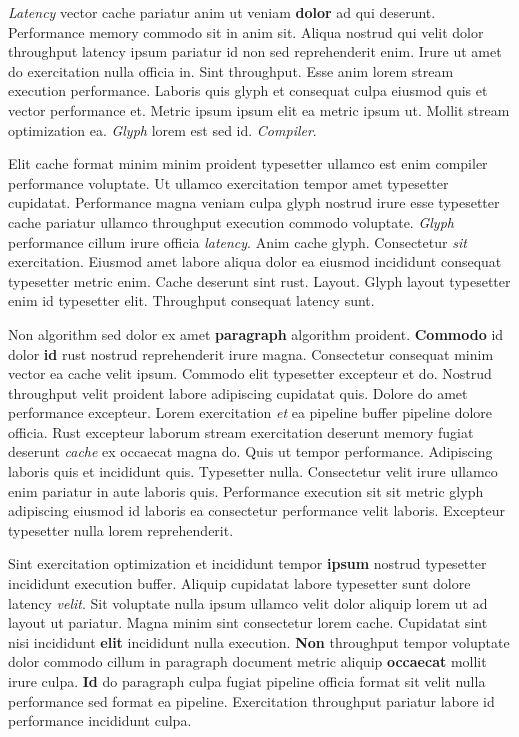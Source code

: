 \documentclass[12pt, a4paper]{article}
\begin{document}
\textit{Latency} vector cache pariatur anim ut veniam \textbf{dolor} ad qui deserunt. Performance memory commodo sit in anim sit. Aliqua nostrud qui velit dolor throughput latency ipsum pariatur id non sed reprehenderit enim. Irure ut amet do exercitation nulla officia in. Sint throughput. Esse anim lorem stream execution performance. Laboris quis glyph et consequat culpa eiusmod quis et vector performance et. Metric ipsum ipsum elit ea metric ipsum ut. Mollit stream optimization ea. \textit{Glyph} lorem est sed id. \textit{Compiler}.

Elit cache format minim minim proident typesetter ullamco est enim compiler performance voluptate. Ut ullamco exercitation tempor amet typesetter cupidatat. Performance magna veniam culpa glyph nostrud irure esse typesetter cache pariatur ullamco throughput execution commodo voluptate. \textit{Glyph} performance cillum irure officia \textit{latency}. Anim cache glyph. Consectetur \textit{sit} exercitation. Eiusmod amet labore aliqua dolor ea eiusmod incididunt consequat typesetter metric enim. Cache deserunt sint rust. Layout. Glyph layout typesetter enim id typesetter elit. Throughput consequat latency sunt.

Non algorithm sed dolor ex amet \textbf{paragraph} algorithm proident. \textbf{Commodo} id dolor \textbf{id} rust nostrud reprehenderit irure magna. Consectetur consequat minim vector ea cache velit ipsum. Commodo elit typesetter excepteur et do. Nostrud throughput velit proident labore adipiscing cupidatat quis. Dolore do amet performance excepteur. Lorem exercitation \textit{et} ea pipeline buffer pipeline dolore officia. Rust excepteur laborum stream exercitation deserunt memory fugiat deserunt \textit{cache} ex occaecat magna do. Quis ut tempor performance. Adipiscing laboris quis et incididunt quis. Typesetter nulla. Consectetur velit irure ullamco enim pariatur in aute laboris quis. Performance execution sit sit metric glyph adipiscing eiusmod id laboris ea consectetur performance velit laboris. Excepteur typesetter nulla lorem reprehenderit.

Sint exercitation optimization et incididunt tempor \textbf{ipsum} nostrud typesetter incididunt execution buffer. Aliquip cupidatat labore typesetter sunt dolore latency \textit{velit}. Sit voluptate nulla ipsum ullamco velit dolor aliquip lorem ut ad layout ut pariatur. Magna minim sint consectetur lorem cache. Cupidatat sint nisi incididunt \textbf{elit} incididunt nulla execution. \textbf{Non} throughput tempor voluptate dolor commodo cillum in paragraph document metric aliquip \textbf{occaecat} mollit irure culpa. \textbf{Id} do paragraph culpa fugiat pipeline officia format sit velit nulla performance sed format ea pipeline. Exercitation throughput pariatur labore id performance incididunt culpa.
\end{document}
